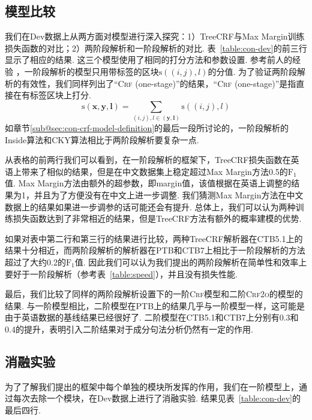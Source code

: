 

\subsection{模型比较}

我们在Dev数据上从两方面对模型进行深入探究：1）TreeCRF与Max Margin训练损失函数的对比；2）两阶段解析和一阶段解析的对比.
表~\ref{table:con-dev}的前三行显示了相应的结果.
这三个模型使用了相同的打分方法和参数设置.
参考前人的经验 \citep{stern-etal-2017-minimal}，一阶段解析的模型只用带标签的区块$\mathrm{s}((i,j),l)$的分值.
为了验证两阶段解析的有效性，我们同样列出了``\textsc{Crf} (one-stage)''的结果，``\textsc{Crf} (one-stage)''是指直接在有标签区块上打分.
\begin{equation} \label{eq:tree-label-score}
  \mathrm{s}(\boldsymbol{x},\boldsymbol{y},\boldsymbol{l}) =
  \sum_{(i,j),l \in (\boldsymbol{y}, \boldsymbol{l})} \mathrm{s}((i,j),l)
\end{equation}
如章节\ref{sub@sec:con-crf-model-definition}的最后一段所讨论的，一阶段解析的Inside算法和CKY算法相比于两阶段解析要复杂一点.

从表格的前两行我们可以看到，在一阶段解析的框架下，TreeCRF损失函数在英语上带来了相似的结果，但是在中文数据集上稳定超过Max Margin方法0.5的$\mathrm{F}_1$值.
Max Margin方法由额外的超参数，即margin值，该值根据在英语上调整的结果为1，并且为了方便没有在中文上进一步调整.
我们猜测Max Margin方法在中文数据上的结果如果进一步调参的话可能还会有提升.
总体上，我们可以认为两种训练损失函数达到了非常相近的结果，但是TreeCRF方法有额外的概率建模的优势.

如果对表中第二行和第三行的结果进行比较，两种TreeCRF解析器在CTB5.1上的结果十分相近，而两阶段解析的解析器在PTB和CTB7上相比于一阶段解析的方法超过了大约0.2的$\mathrm{F}_1$值.
因此我们可以认为我们提出的两阶段解析在简单性和效率上要好于一阶段解析（参考表~\ref{table:speed}），并且没有损失性能.

最后，我们比较了同样的两阶段解析设置下的一阶\textsc{Crf}模型和二阶\textsc{Crf2o}的模型的结果.
与一阶模型相比，二阶模型在PTB上的结果几乎与一阶模型一样，这可能是由于英语数据的基线结果已经很好了.
二阶模型在CTB5.1和CTB7上分别有0.3和0.4的提升，表明引入二阶结果对于成分句法分析仍然有一定的作用.

\subsection{消融实验}

为了了解我们提出的框架中每个单独的模块所发挥的作用，我们在一阶模型上，通过每次去除一个模块，在Dev数据上进行了消融实验.
结果见表~\ref{table:con-dev}的最后四行.


